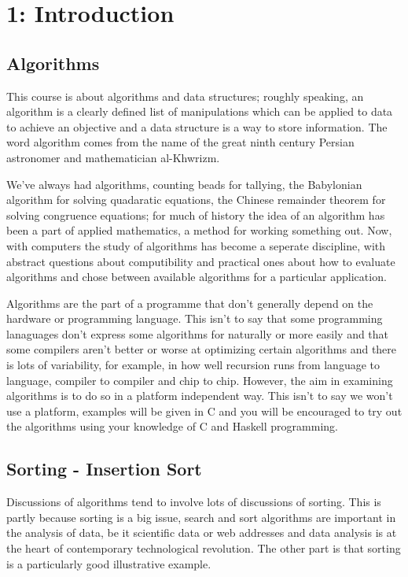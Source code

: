 \documentclass[11pt,a4paper]{scrartcl}
\begin{document}
\section*{1: Introduction}

\subsection*{Algorithms}

This course is about algorithms and data structures; roughly speaking,
an algorithm is a clearly defined list of manipulations which can be
applied to data to achieve an objective and a data structure is a way
to store information. The word algorithm comes from the name of the
great ninth century Persian astronomer and mathematician
al-Khwrizm. 

We've always had algorithms, counting beads for tallying, the
Babylonian algorithm for solving quadaratic equations, the Chinese
remainder theorem for solving congruence equations; for much of
history the idea of an algorithm has been a part of applied
mathematics, a method for working something out. Now, with computers
the study of algorithms has become a seperate discipline, with
abstract questions about computibility and practical ones about how to
evaluate algorithms and chose between available algorithms for a
particular application.

Algorithms are the part of a programme that don't generally depend
on the hardware or programming language. This isn't to say that some
programming lanaguages don't express some algorithms for naturally or
more easily and that some compilers aren't better or worse at
optimizing certain algorithms and there is lots of variability, for
example, in how well recursion runs from language to language,
compiler to compiler and chip to chip. However, the aim in examining
algorithms is to do so in a platform independent way. This isn't to
say we won't use a platform, examples will be given in C and you will
be encouraged to try out the algorithms using your knowledge of C and
Haskell programming.

\subsection*{Sorting - Insertion Sort}

Discussions of algorithms tend to involve lots of discussions of
sorting. This is partly because sorting is a big issue, search and
sort algorithms are important in the analysis of data, be it
scientific data or web addresses and data analysis is at the heart of
contemporary technological revolution. The other part is that sorting
is a particularly good illustrative example.
\end{document}
